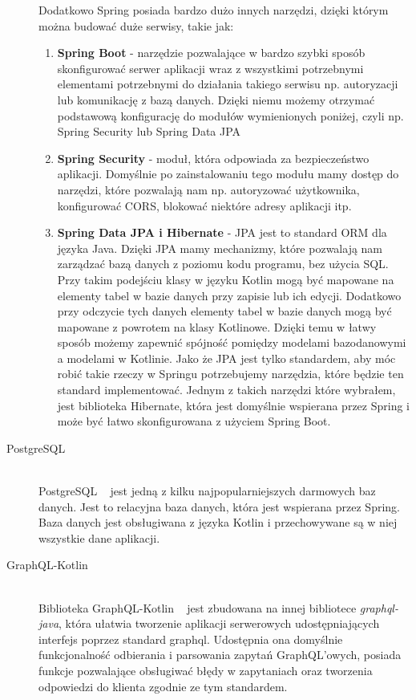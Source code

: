\begin{description}
    Dodatkowo Spring posiada bardzo dużo innych narzędzi, dzięki którym można budować duże serwisy, takie jak:
    \begin{enumerate}
      \item \textbf{Spring Boot} - narzędzie pozwalające w bardzo szybki sposób skonfigurować serwer aplikacji wraz z wszystkimi potrzebnymi elementami potrzebnymi do działania takiego serwisu np. autoryzacji lub komunikację z bazą danych. Dzięki niemu możemy otrzymać podstawową konfigurację do modułów wymienionych poniżej, czyli np. Spring Security lub Spring Data JPA
      \item \textbf{Spring Security} - moduł, która odpowiada za bezpieczeństwo aplikacji. Domyślnie po zainstalowaniu tego modułu mamy dostęp do narzędzi, które pozwalają nam np. autoryzować użytkownika, konfigurować CORS, blokować niektóre adresy aplikacji itp.
      \item \textbf{Spring Data JPA i Hibernate} - JPA jest to standard ORM dla języka Java. Dzięki JPA mamy mechanizmy, które pozwalają nam zarządzać bazą danych z poziomu kodu programu, bez użycia SQL. Przy takim podejściu klasy w języku Kotlin mogą być mapowane na elementy tabel w bazie danych przy zapisie lub ich edycji. Dodatkowo przy odczycie tych danych elementy tabel w bazie danych mogą być mapowane z powrotem na klasy Kotlinowe. Dzięki temu w łatwy sposób możemy zapewnić spójność pomiędzy modelami bazodanowymi a modelami w Kotlinie. Jako że JPA jest tylko standardem, aby móc robić takie rzeczy w Springu potrzebujemy narzędzia, które będzie ten standard implementować. Jednym z takich narzędzi które wybrałem, jest biblioteka Hibernate, która jest domyślnie wspierana przez Spring i może być łatwo skonfigurowana z użyciem Spring Boot.
    \end{enumerate}


  \vspace{0.4cm}

  \item[PostgreSQL] \hfill \\ PostgreSQL ~\cite{ref_postgre_doc} jest jedną z kilku najpopularniejszych darmowych baz danych. Jest to relacyjna baza danych, która jest wspierana przez Spring. Baza danych jest obsługiwana z języka Kotlin i przechowywane są w niej wszystkie dane aplikacji.

  \vspace{0.4cm}

  \item[GraphQL-Kotlin] \hfill \\ Biblioteka GraphQL-Kotlin ~\cite{ref_gqlKotlin_doc} jest zbudowana na innej bibliotece \emph{graphql-java}, która ułatwia tworzenie aplikacji serwerowych udostępniających interfejs poprzez standard graphql. Udostępnia ona domyślnie funkcjonalność odbierania i parsowania zapytań GraphQL'owych, posiada funkcje pozwalające obsługiwać błędy w zapytaniach oraz tworzenia odpowiedzi do klienta zgodnie ze tym standardem.
\end{description}


